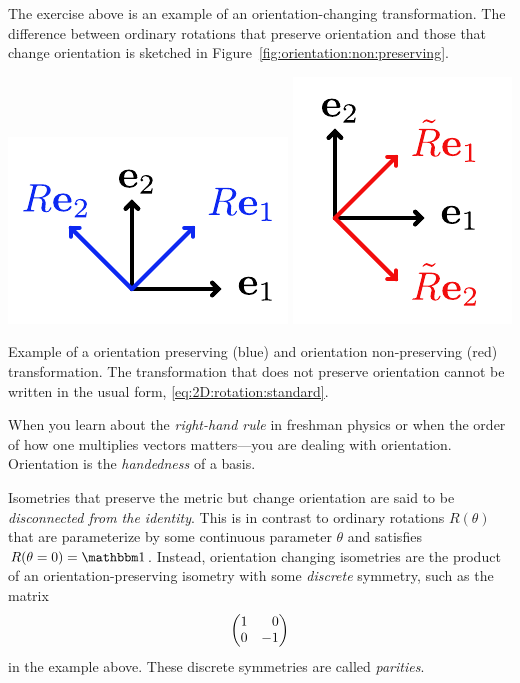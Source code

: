 \documentclass[12pt, oneside]{report}    %
\begin{document}
The exercise above is an example of an orientation-changing transformation. The difference between ordinary rotations that preserve orientation and those that change orientation is sketched in Figure~\ref{fig:orientation:non:preserving}.
\begin{marginfigure}%
    \includegraphics[width=.5\textwidth]{figures/OrientationPreserving.pdf}
    \includegraphics[width=.4\textwidth]{figures/OrientationNonPreserving.pdf}
    \caption{Example of a orientation preserving (blue) and orientation non-preserving (red) transformation. The transformation that does not preserve orientation cannot be written in the usual form, \eqref{eq:2D:rotation:standard}.}
    \label{fig:orientation:non:preserving}
\end{marginfigure}
When you learn about the \emph{right-hand rule} in freshman physics or when the order of how one multiplies vectors matters---you are dealing with orientation. Orientation is the \emph{handedness} of a basis. 

Isometries that preserve the metric but change orientation are said to be \emph{disconnected from the identity}. This is in contrast to ordinary rotations $R(\theta)$ that are parameterize by some continuous parameter $\theta$ and satisfies $R(\theta = 0) = \one$. Instead, orientation changing isometries are the product of an orientation-preserving isometry with some \emph{discrete} symmetry, such as the matrix
\begin{align}
    \begin{pmatrix}
        1 & \pp 0 \\
        0 & -1
    \end{pmatrix}
\end{align}
in the example above. These discrete symmetries are called \emph{parities}. 
\end{document}
